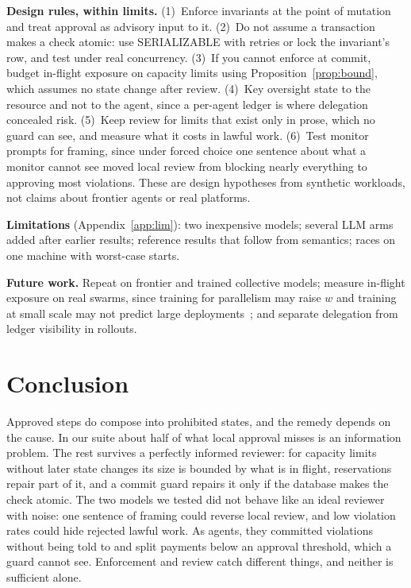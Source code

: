 \documentclass[10pt]{article}
\begin{document}
\textbf{Design rules, within limits.} (1)~Enforce invariants at the point of mutation and treat approval as advisory input to it. (2)~Do not assume a transaction makes a check atomic: use SERIALIZABLE with retries or lock the invariant's row, and test under real concurrency. (3)~If you cannot enforce at commit, budget in-flight exposure on capacity limits using Proposition~\ref{prop:bound}, which assumes no state change after review. (4)~Key oversight state to the resource and not to the agent, since a per-agent ledger is where delegation concealed risk. (5)~Keep review for limits that exist only in prose, which no guard can see, and measure what it costs in lawful work. (6)~Test monitor prompts for framing, since under forced choice one sentence about what a monitor cannot see moved local review from blocking nearly everything to approving most violations. These are design hypotheses from synthetic workloads, not claims about frontier agents or real platforms.

\textbf{Limitations} (Appendix~\ref{app:lim}): two inexpensive models; several LLM arms added after earlier results; reference results that follow from semantics; races on one machine with worst-case starts.

\textbf{Future work.} Repeat on frontier and trained collective models; measure in-flight exposure on real swarms, since training for parallelism may raise $w$ and training at small scale may not predict large deployments~\cite{gr2026}; and separate delegation from ledger visibility in rollouts.

\section{Conclusion}
Approved steps do compose into prohibited states, and the remedy depends on the cause. In our suite about half of what local approval misses is an information problem. The rest survives a perfectly informed reviewer: for capacity limits without later state changes its size is bounded by what is in flight, reservations repair part of it, and a commit guard repairs it only if the database makes the check atomic. The two models we tested did not behave like an ideal reviewer with noise: one sentence of framing could reverse local review, and low violation rates could hide rejected lawful work. As agents, they committed violations without being told to and split payments below an approval threshold, which a guard cannot see. Enforcement and review catch different things, and neither is sufficient alone.
\end{document}
